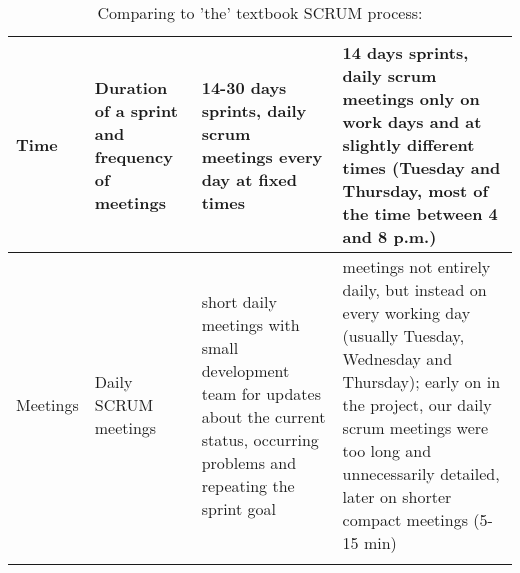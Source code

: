 \begin{longtable}{|p{}|p{}|p{}|p{}|}
    \hline
    Time & Duration of a sprint and frequency of meetings & 14-30 days sprints, daily scrum meetings every day at fixed times & 14 days sprints, daily scrum meetings only on work days and at slightly different times (Tuesday and Thursday, most of the time between 4 and 8 p.m.) \\
    \hline
    Meetings & Daily SCRUM meetings & short daily meetings with small development team for updates about the current status, occurring problems and repeating the sprint goal & meetings not entirely daily, but instead on every working day (usually Tuesday, Wednesday and Thursday); early on in the project, our daily scrum meetings were too long and unnecessarily detailed, later on shorter compact meetings (5-15 min) \\
    \hline
    \hline
  \caption{Comparing to 'the' textbook SCRUM process:}
\end{longtable}

